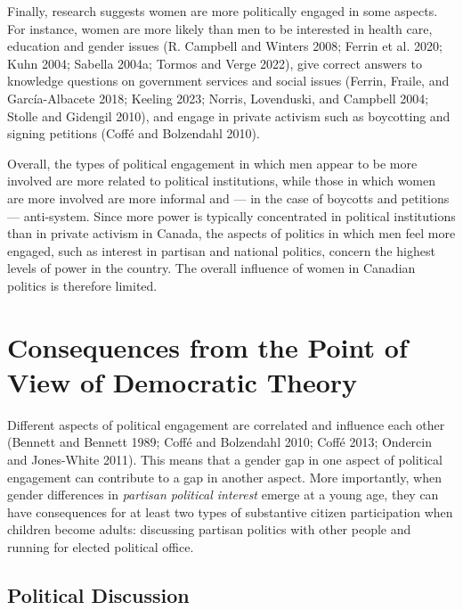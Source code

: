 \documentclass[
  letterpaper,
  DIV=11,
  numbers=noendperiod]{scrreprt}
\begin{document}
Finally, research suggests women are more politically engaged in some
aspects. For instance, women are more likely than men to be interested
in health care, education and gender issues (R. Campbell and Winters
2008; Ferrin et al. 2020; Kuhn 2004; Sabella 2004a; Tormos and Verge
2022), give correct answers to knowledge questions on government
services and social issues (Ferrin, Fraile, and García-Albacete 2018;
Keeling 2023; Norris, Lovenduski, and Campbell 2004; Stolle and Gidengil
2010), and engage in private activism such as boycotting and signing
petitions (Coffé and Bolzendahl 2010).

Overall, the types of political engagement in which men appear to be
more involved are more related to political institutions, while those in
which women are more involved are more informal and --- in the case of
boycotts and petitions --- anti-system. Since more power is typically
concentrated in political institutions than in private activism in
Canada, the aspects of politics in which men feel more engaged, such as
interest in partisan and national politics, concern the highest levels
of power in the country. The overall influence of women in Canadian
politics is therefore limited.

\section{Consequences from the Point of View of Democratic
Theory}\label{consequences-from-the-point-of-view-of-democratic-theory}

Different aspects of political engagement are correlated and influence
each other (Bennett and Bennett 1989; Coffé and Bolzendahl 2010; Coffé
2013; Ondercin and Jones-White 2011). This means that a gender gap in
one aspect of political engagement can contribute to a gap in another
aspect. More importantly, when gender differences in \emph{partisan
political interest} emerge at a young age, they can have consequences
for at least two types of substantive citizen participation when
children become adults: discussing partisan politics with other people
and running for elected political office.

\subsection{Political Discussion}\label{political-discussion}
\end{document}
